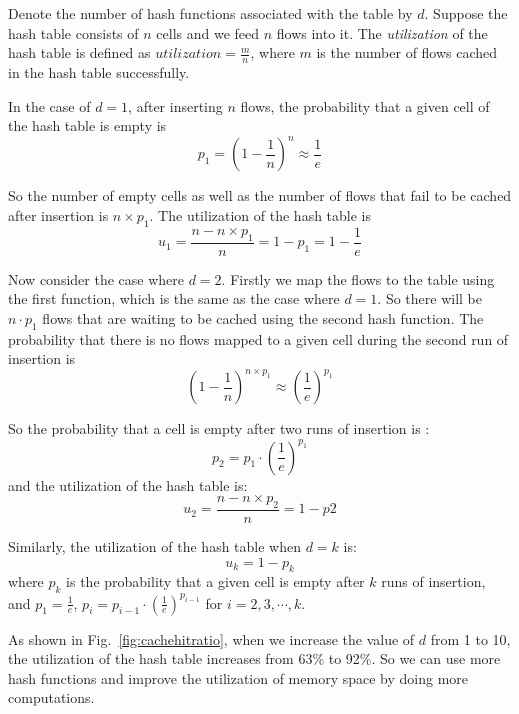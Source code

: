 Denote the number of hash functions associated with the table by $d$. Suppose the hash table consists of $n$ cells and we feed $n$ flows into it. The \emph{utilization} of the hash table is defined as $utilization=\frac{m}{n}$, where $m$ is the number of flows cached in the hash table successfully. 

In the case of $d=1$, after inserting $n$ flows, the probability that a given cell of the hash table is empty is 
\begin{equation}\label{key}
p_1 = (1 - \frac{1}{n})^n\approx \frac{1}{e}
\end{equation}

So the number of empty cells  as well as the number of flows that fail to be cached after insertion is $n\times p_1$. The utilization of the hash table is 
\begin{equation}
u_1 = \frac{n-n\times p_1}{n} = 1-p_1 = 1 - \frac{1}{e}
\end{equation}

Now consider the case where $d=2$. Firstly we map the flows to the table using the first function, which is the same as the case where $d=1$. So there will be $n\cdot p_1$ flows that are waiting to be cached using the second hash function. The probability that there is no flows mapped to a given cell during the second run of insertion is
\begin{equation}
(1 - \frac{1}{n})^{n\times p_1}\approx(\frac{1}{e})^{p_1}
\end{equation}

So the probability that a cell is empty after two runs of insertion is :
\begin{equation}
p_2 = p_1\cdot (\frac{1}{e})^{p_1}
\end{equation}
and the utilization of the hash table is:
\begin{equation}
u_2 = \frac{n - n\times p_2}{n} = 1 - p2
\end{equation}

Similarly, the utilization of the hash table when $d=k$ is:
\begin{equation}
u_k = 1 - p_k
\end{equation}
where $p_k$ is the probability that a given cell is empty after $k$ runs of insertion, and $p_1 = \frac{1}{e}$, $p_i = p_{i-1}\cdot (\frac{1}{e})^{p_{i-1}}$ for $i = 2, 3, \cdots, k$.

As shown in Fig.~\ref{fig:cachehitratio}, when we increase the value of $d$ from 1 to 10, the utilization of the hash table increases from 63\% to 92\%. So we can use more hash functions and improve the utilization of memory space by doing more computations.
\fi
